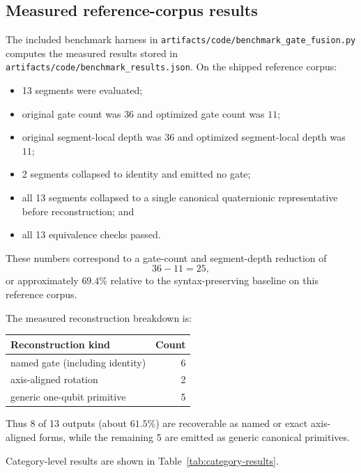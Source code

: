 \documentclass[11pt]{article}
\theoremstyle{remark}
\begin{document}
\subsection{Measured reference-corpus results}

The included benchmark harness in
\texttt{artifacts/code/benchmark\_gate\_fusion.py} computes the measured results
stored in \texttt{artifacts/code/benchmark\_results.json}. On the shipped
reference corpus:
\begin{itemize}[leftmargin=1.5em]
\item 13 segments were evaluated;
\item original gate count was $36$ and optimized gate count was $11$;
\item original segment-local depth was $36$ and optimized segment-local depth
was $11$;
\item 2 segments collapsed to identity and emitted no gate;
\item all 13 segments collapsed to a single canonical quaternionic
representative before reconstruction; and
\item all 13 equivalence checks passed.
\end{itemize}

These numbers correspond to a gate-count and segment-depth reduction of
\[
36-11=25,
\]
or approximately $69.4\%$ relative to the syntax-preserving baseline on this
reference corpus.

The measured reconstruction breakdown is:
\begin{center}
\begin{tabular}{@{}lr@{}}
\toprule
Reconstruction kind & Count \\
\midrule
named gate (including identity) & 6 \\
axis-aligned rotation & 2 \\
generic one-qubit primitive & 5 \\
\bottomrule
\end{tabular}
\end{center}
Thus 8 of 13 outputs (about $61.5\%$) are recoverable as named or exact
axis-aligned forms, while the remaining 5 are emitted as generic canonical
primitives.

Category-level results are shown in Table~\ref{tab:category-results}.
\end{document}
